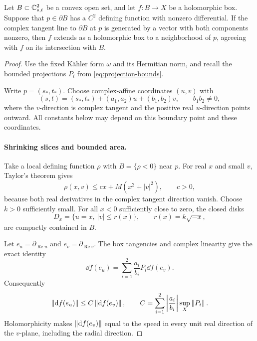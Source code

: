 \begin{proposition}\label{prop:mixed}
Let $B\subset\mathbb C^2_{s,t}$ be a convex open set, and let $f:B\to X$ be a
holomorphic box.  Suppose that $p\in\partial B$ has a $C^2$ defining
function with nonzero differential.  If the complex tangent line to
$\partial B$ at $p$ is generated by a vector with both components
nonzero, then $f$ extends as a holomorphic box to a neighborhood of $p$,
agreeing with $f$ on its intersection with $B$.
\end{proposition}

\begin{proof}
Use the fixed K\"ahler form $\omega$ and its Hermitian norm, and recall
the bounded projections $P_i$ from \eqref{eq:projection-bounds}.

Write $p=(s_*,t_*)$.  Choose complex-affine coordinates $(u,v)$ with
\begin{equation}\label{eq:boundary-affine}
  (s,t)=(s_*,t_*)+(a_1,a_2)u+(b_1,b_2)v,
  \qquad b_1b_2\ne0,
\end{equation}
where the $v$-direction is complex tangent and the positive real
$u$-direction points outward.  All constants below may depend on this
boundary point and these coordinates.

\paragraph{Shrinking slices and bounded area.}
Take a local defining function $\rho$ with $B=\{\rho<0\}$ near $p$.
For real $x$ and small $v$, Taylor's theorem gives
\[
  \rho(x,v)\le c x+M(x^2+|v|^2),\qquad c>0,
\]
because both real derivatives in the complex tangent direction vanish.
Choose $k>0$ sufficiently small.  For all $x<0$ sufficiently close to
zero, the closed disks
\[
  D_x=\{u=x,\ |v|\le r(x)\},\qquad r(x)=k\sqrt{-x},
\]
are compactly contained in $B$.

Let $e_u=\partial_{\operatorname{Re}u}$ and
$e_v=\partial_{\operatorname{Re}v}$.  The box tangencies and complex
linearity give the exact identity
\[
  \dd f(e_u)=\sum_{i=1}^2\frac{a_i}{b_i}P_i\dd f(e_v).
\]
Consequently
\begin{equation}\label{eq:boundary-speed}
  \left\lVert\mathrm d f(e_u)\right\rVert\le C\left\lVert\mathrm d f(e_v)\right\rVert,\qquad
  C=\sum_{i=1}^2\left|\frac{a_i}{b_i}\right|
       \sup_X\left\lVert P_i\right\rVert.
\end{equation}
Holomorphicity makes $\left\lVert\mathrm d f(e_v)\right\rVert$ equal to the speed in every unit
real direction of the $v$-plane, including the radial direction.


\end{proof}
